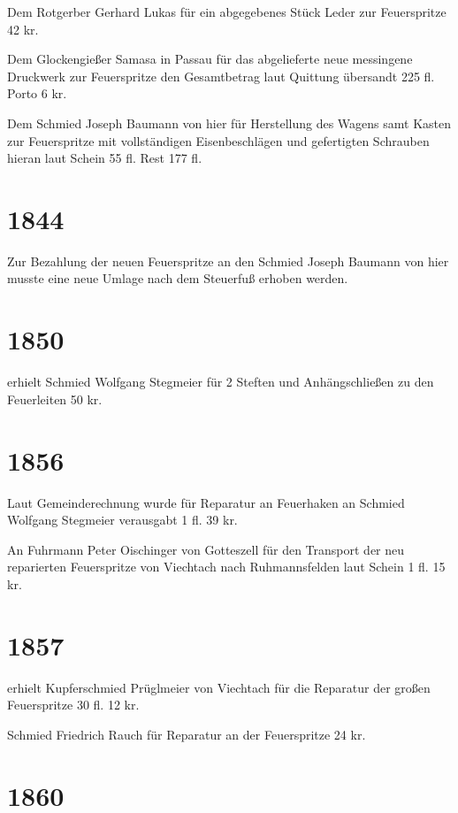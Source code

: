 \documentclass[12pt,a4paper]{book}
\begin{document}
Dem Rotgerber Gerhard Lukas für ein abgegebenes Stück Leder zur Feuerspritze 42
kr.

Dem Glockengießer Samasa in Passau für das abgelieferte neue messingene
Druckwerk zur Feuerspritze den Gesamtbetrag laut Quittung übersandt 225 fl.
Porto 6 kr.

Dem Schmied Joseph Baumann von hier für Herstellung des Wagens samt Kasten zur
Feuerspritze mit vollständigen Eisenbeschlägen und gefertigten Schrauben hieran
laut Schein 55 fl. Rest 177 fl.

\section*{1844}

Zur Bezahlung der neuen Feuerspritze an den Schmied Joseph Baumann von hier
musste eine neue Umlage nach dem Steuerfuß erhoben werden.

\section*{1850}

erhielt Schmied Wolfgang Stegmeier für 2 Steften und Anhängschließen zu den
Feuerleiten 50 kr.

\section*{1856}

Laut Gemeinderechnung wurde für Reparatur an Feuerhaken an Schmied Wolfgang
Stegmeier verausgabt 1 fl. 39 kr.

An Fuhrmann Peter Oischinger von Gotteszell für den Transport der neu
reparierten Feuerspritze von Viechtach nach Ruhmannsfelden laut Schein 1 fl. 15
kr.

\section*{1857}

erhielt Kupferschmied Prüglmeier von Viechtach für die Reparatur der großen
Feuerspritze 30 fl. 12 kr.

Schmied Friedrich Rauch für Reparatur an der Feuerspritze 24 kr.

\section*{1860}
\end{document}
